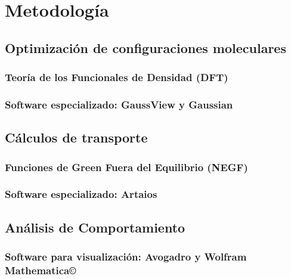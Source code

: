     
\chapter{Metodología}
    \section{Optimización de configuraciones moleculares}
        \subsection{Teoría de los Funcionales de Densidad (DFT)}
        \subsection{Software especializado: GaussView y Gaussian}
    \section{Cálculos de transporte}
        \subsection{Funciones de Green Fuera del Equilibrio (NEGF)}
        \subsection{Software especializado: Artaios}
    \section{Análisis de Comportamiento}
        \subsection{Software para visualización: Avogadro y Wolfram Mathematica\copyright}